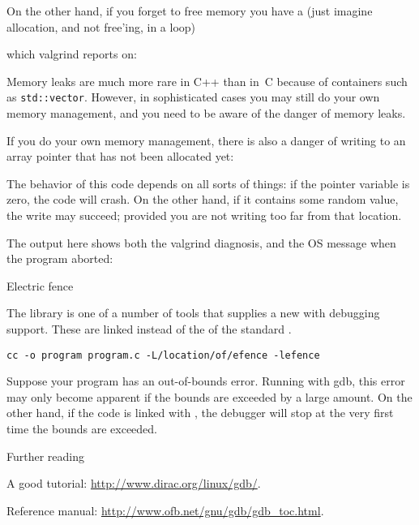 On the other hand, if you forget to free memory you have a
(just imagine allocation, and not free'ing, in a loop)
%

which valgrind reports on:
%


Memory leaks are much more rare in C++ than in~C
because of containers such as \lstinline{std::vector}.
However, in sophisticated cases you may still do your own
memory management, and you need to be aware of the danger of memory leaks.

If you do your own memory management, there is also a danger
of writing to an array pointer that has not been allocated yet:
%

The behavior of this code depends on all sorts of things:
if the pointer variable is zero, the code will crash.
On the other hand, if it contains some random value,
the write may succeed; provided you are not writing
too far from that location.

The output here shows both the valgrind diagnosis,
and the \ac{OS} message when the program aborted:
%



 {Electric fence}

The  library is one of a number of tools
that supplies a new  with debugging support.
These are linked instead of the  of the standard
.

\begin{verbatim}
cc -o program program.c -L/location/of/efence -lefence
\end{verbatim}

Suppose your program has an out-of-bounds error. Running with gdb,
this error may only become apparent if the bounds are exceeded by a
large amount. On the other hand, if the code is linked with
, the debugger will stop at the very first time
the bounds are exceeded.

 {Further reading}

A good tutorial: \url{http://www.dirac.org/linux/gdb/}.

Reference manual: \url{http://www.ofb.net/gnu/gdb/gdb_toc.html}.



